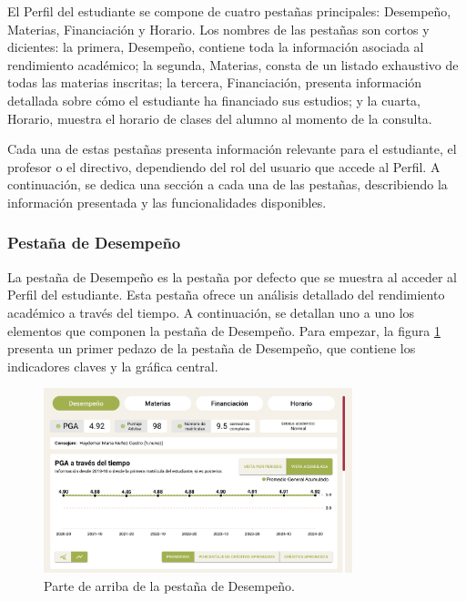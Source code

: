 El Perfil del estudiante se compone de cuatro pestañas principales: Desempeño, Materias, Financiación y Horario. Los nombres de las pestañas son cortos y dicientes: la primera, Desempeño, contiene toda la información asociada al rendimiento académico; la segunda, Materias, consta de un listado exhaustivo de todas las materias inscritas; la tercera, Financiación, presenta información detallada sobre cómo el estudiante ha financiado sus estudios; y la cuarta, Horario, muestra el horario de clases del alumno al momento de la consulta.

Cada una de estas pestañas presenta información relevante para el estudiante, el profesor o el directivo, dependiendo del rol del usuario que accede al Perfil. A continuación, se dedica una sección a cada una de las pestañas, describiendo la información presentada y las funcionalidades disponibles.

\subsubsection{Pestaña de Desempeño}

La pestaña de Desempeño es la pestaña por defecto que se muestra al acceder al Perfil del estudiante. Esta pestaña ofrece un análisis detallado del rendimiento académico a través del tiempo. A continuación, se detallan uno a uno los elementos que componen la pestaña de Desempeño. Para empezar, la figura \ref{fig:desempeno} presenta un primer pedazo de la pestaña de Desempeño, que contiene los indicadores claves y la gráfica central.

\begin{figure}[H]
  \centering
  \includegraphics[width=0.8\textwidth]{img/nes/desempeno_1.png}
  \caption{Parte de arriba de la pestaña de Desempeño.}
  \label{fig:desempeno}
\end{figure}

